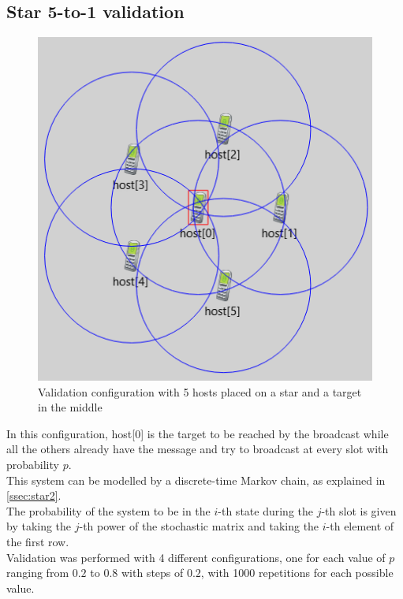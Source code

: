 \subsection{Star 5-to-1 validation}
\begin{figure}
	\vspace*{-1.0cm}
	\includegraphics[width=1\linewidth]{img/omnetStar5to1.png} 
	\caption{Validation configuration with 5 hosts placed on a star and a target in the middle}
	\label{fig:star5to1GUI}
\end{figure}
In this configuration, host[0] is the target to be reached by the broadcast
while all the others already have the message and try to broadcast at every
slot with probability $p$.\\
This system can be modelled by a discrete-time Markov chain, as explained in
\ref{ssec:star2}.\\
The probability of the system to be in the $i$-th state during the $j$-th slot
is given by taking the $j$-th power of the stochastic matrix and taking the
$i$-th element of the first row.\\
Validation was performed with 4 different configurations, one for each value of
$p$ ranging from $0.2$ to $0.8$ with steps of $0.2$, with 1000 repetitions for
each possible value.\\

